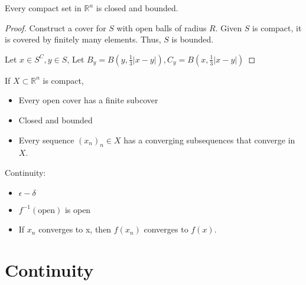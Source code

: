 \documentclass[a4paper]{article}
\numberwithin{equation}{section}
\newcommand{\R}{\mathbb{R}}
\begin{document}
\begin{theorem}
    Every compact set in $\R^n$ is closed and bounded.
    \begin{proof}
        Construct a cover for $S$ with open balls of radius $R$. Given $S$ is compact, it is covered by finitely many elements. Thus, $S$ is bounded.
        
        Let $x\in S^C, y\in S$, Let $B_y=B(y,\frac{1}{3}|x-y|),C_y=B(x,\frac{1}{3}|x-y|)$
    \end{proof}
\end{theorem}

If $X\subset\R^n$ is compact, 
\begin{itemize}
    \item Every open cover has a finite subcover
    \item Closed and bounded
    \item Every sequence $(x_n)_n\in X$ has a converging subsequences that converge in $X$.
\end{itemize}

Continuity:
\begin{itemize}
    \item $\epsilon-\delta$
    \item $f^{-1}(\text{open})$ is open
    \item If $x_n$ converges to x, then $f(x_n)$ converges to $f(x)$.
\end{itemize}

\section{Continuity}
\end{document}
